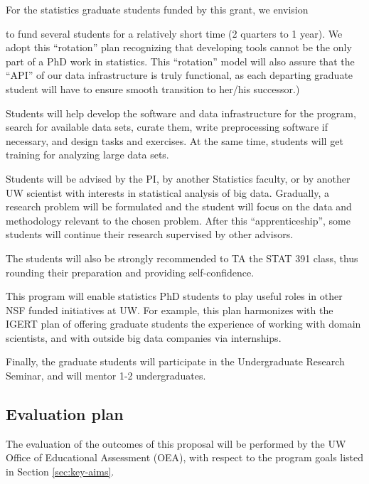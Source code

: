 For the statistics graduate students funded by this grant, we envision 
\bits
\item to fund several students for a relatively short time (2 quarters
  to 1 year). We adopt this ``rotation'' plan recognizing that developing 
tools cannot be the only part of a PhD work in statistics. 
This ``rotation'' model will also assure that the ``API'' of our data
infrastructure is truly functional, as each departing graduate student 
will have to ensure smooth transition to her/his successor.)
\item Students will help develop the software and data infrastructure for
  the program, search for available data sets, curate them, write
  preprocessing software if necessary, and design tasks and exercises. 
  At the same time, students will get training for analyzing large data sets. 
\item Students will be advised by the PI, by another Statistics faculty, or by another UW scientist with interests in statistical analysis of big data. Gradually, a research problem will be formulated and the student will
focus on the data and methodology relevant to the chosen problem. After this ``apprenticeship'', 
some students will continue their research supervised by other advisors. 
\item The students will also be strongly recommended to TA the STAT 391 class, thus rounding their preparation and providing self-confidence. 
\item This program will enable statistics PhD students to play useful roles in other NSF funded initiatives at UW. For 
example, this plan harmonizes with the IGERT plan of offering graduate students the experience of working with domain scientists, and with outside big data companies via internships. 
\item Finally, the graduate students will participate in the Undergraduate Research Seminar, and will mentor 1-2 undergraduates. 
 \eits

\subsection{Evaluation plan}

The evaluation of the outcomes of this proposal will be performed by
the UW Office of Educational Assessment (OEA), with respect to the
program goals listed in Section \ref{sec:key-aims}.

